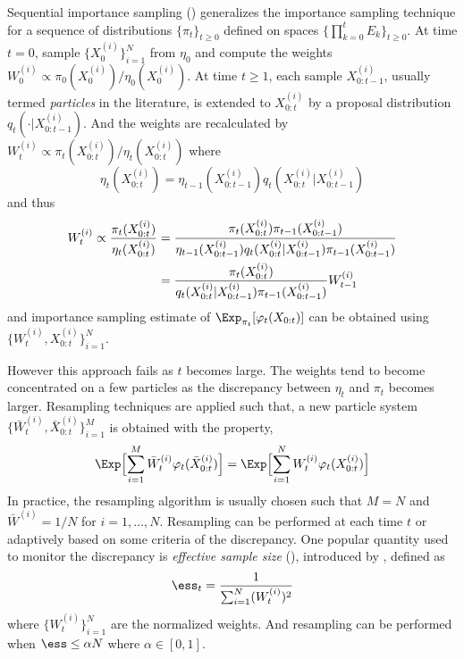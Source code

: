 \documentclass[11pt,bib,hyper]{marticle}
\begin{document}
Sequential importance sampling (\sis) generalizes the importance sampling
technique for a sequence of distributions $\{\pi_t\}_{t\ge0}$ defined on
spaces $\{\prod_{k=0}^tE_k\}_{t\ge0}$. At time $t = 0$, sample
$\{X_0^{(i)}\}_{i=1}^N$ from $\eta_0$ and compute the weights $W_0^{(i)}
\propto \pi_0(X_0^{(i)})/\eta_0(X_0^{(i)})$. At time $t\ge1$, each sample
$X_{0:t-1}^{(i)}$, usually termed \emph{particles} in the literature, is
extended to $X_{0:t}^{(i)}$ by a proposal distribution
$q_t(\cdot|X_{0:t-1}^{(i)})$. And the weights are recalculated by $W_t^{(i)}
\propto \pi_t(X_{0:t}^{(i)})/\eta_t(X_{0:t}^{(i)})$ where
\begin{equation}
  \eta_t(X_{0:t}^{(i)}) =
  \eta_{t-1}(X_{0:t-1}^{(i)})q_t(X_{0:t}^{(i)}|X_{0:t-1}^{(i)})
\end{equation}
and thus
\begin{align}
  W_t^{(i)} \propto \frac{\pi_t(X_{0:t}^{(i)})}{\eta_t(X_{0:t}^{(i)})}
  &= \frac{\pi_t(X_{0:t}^{(i)})\pi_{t-1}(X_{0:t-1}^{(i)})}
  {\eta_{t-1}(X_{0:t-1}^{(i)})q_t(X_{0:t}^{(i)}|X_{0:t-1}^{(i)})
    \pi_{t-1}(X_{0:t-1}^{(i)})} \notag\\
  &= \frac{\pi_t(X_{0:t}^{(i)})}
  {q_t(X_{0:t}^{(i)}|X_{0:t-1}^{(i)})\pi_{t-1}(X_{0:t-1}^{(i)})}W_{t-1}^{(i)}
  \label{eq:si}
\end{align}
and importance sampling estimate of $\Exp_{\pi_t}[\varphi_t(X_{0:t})]$ can be
obtained using $\{W_t^{(i)},X_{0:t}^{(i)}\}_{i=1}^N$.

However this approach fails as $t$ becomes large. The weights tend to become
concentrated on a few particles as the discrepancy between $\eta_t$ and
$\pi_t$ becomes larger. Resampling techniques are applied such that, a new
particle system $\{\bar{W}_t^{(i)},\bar{X}_{0:t}^{(i)}\}_{i=1}^M$ is obtained
with the property,
\begin{equation}
  \Exp\Bigl[\sum_{i=1}^M\bar{W}_t^{(i)}\varphi_t(\bar{X}_{0:t}^{(i)})\Bigr] =
  \Exp\Bigl[\sum_{i=1}^NW_t^{(i)}\varphi_t(X_{0:t}^{(i)})\Bigr]
  \label{eq:resample}
\end{equation}
In practice, the resampling algorithm is usually chosen such that $M = N$ and
$\bar{W}^{(i)} = 1/N$ for $i=1,\dots,N$. Resampling can be performed at each time
$t$ or adaptively based on some criteria of the discrepancy. One popular
quantity used to monitor the discrepancy is \emph{effective sample size}
(\ess), introduced by \textcite{Liu:1998iu}, defined as
\begin{equation}
  \ess_t = \frac{1}{\sum_{i=1}^N (W_t^{(i)})^2}
\end{equation}
where $\{W_t^{(i)}\}_{i=1}^N$ are the normalized weights. And resampling can
be performed when $\ess\le \alpha N$ where $\alpha\in[0,1]$.
\end{document}
